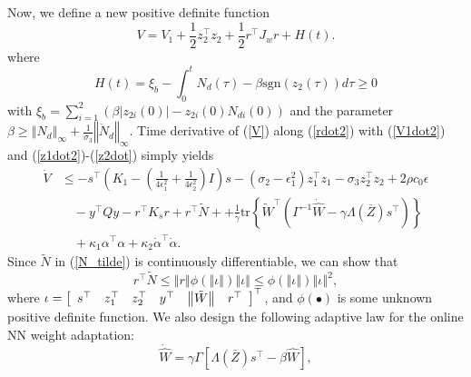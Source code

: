 \documentclass{article}
\newcommand{\sgn}{\text{sgn}}
\newcommand{\tr}{\text{tr}}
\begin{document}
	Now, we define a new positive definite function
	\begin{equation}
	V = V_{1} + \frac{1}{2}z_{2}^{\top}z_{2} + \frac{1}{2}r^{\top}J_{w}r + H(t). \label{V}
	\end{equation}
	where 
	\begin{equation}
	H(t) = \xi_{b}-\int_{0}^{t}N_{d}(\tau)-\beta\sgn\left(z_{2}(\tau)\right)d\tau \geq 0
	\end{equation}
	with $\xi_{b}=\sum_{i=1}^{2}\left(\beta\left\vert z_{2i}(0)\right\vert - z_{2i}(0)N_{di}(0) \right)$ and the parameter $\beta \geq \left\Vert N_{d}\right\Vert_{\infty} + \frac{1}{\sigma_{3}}\left\Vert\dot{N}_{d}\right\Vert_{\infty}$. Time derivative of (\ref{V}) along (\ref{rdot2}) with (\ref{V1dot2}) and (\ref{z1dot2})-(\ref{z2dot}) simply yields
	\begin{align}
	\dot{V} &\leq -s^{\top}\left(K_{1}-\left(\frac{1}{4\epsilon_{1}^{2}}+\frac{1}{4\epsilon_{2}^{2}}\right)I\right)s - \left(\sigma_{2}-\epsilon_{1}^{2}\right)z_{1}^{\top}z_{1} - \sigma_{3}z_{2}^{\top}z_{2} + 2\rho c_{0}\epsilon \nonumber \\ 
	& \quad - y^{\top}Qy - r^{\top}K_{s}r + r^{\top}\tilde{N} + +\frac{1}{\gamma}\tr\left\{\tilde{W}^{\top}\left(\Gamma^{-1}\dot{\hat{W}}-\gamma\Lambda\left(\bar{Z}\right)s^{\top}\right)\right\} \nonumber \\
	& \quad + \kappa_{1}\alpha^{\top}\alpha + \kappa_{2}\dot{\alpha}^{\top}\dot{\alpha}. \label{Vdot}
	\end{align}
	Since $\tilde{N}$ in (\ref{N_tilde}) is continuously differentiable, we can show that
	\begin{equation}
	r^{\top}\tilde{N} \leq \left\Vert r\right\Vert\phi\left(\left\Vert \iota\right\Vert\right)\left\Vert \iota\right\Vert \leq\phi\left(\left\Vert \iota\right\Vert\right)\left\Vert \iota\right\Vert^{2}, \label{rN_tilde}
	\end{equation}
	where $\iota = \left[
	\begin{array}[c]{cccccc}
	s^{\top} & z_{1}^{\top} & z_{2}^{\top} & y^{\top} & \left\Vert \tilde{W}\right\Vert & r^{\top} \\
	\end{array}
	\right]^{\top}$, and $\phi(\bullet)$ is some unknown positive definite function. We also design the following adaptive law for the online NN weight adaptation:
	\begin{equation}
	\dot{\hat{W}} = \gamma\Gamma\left[\Lambda\left(\bar{Z}\right)s^{\top} - \beta\hat{W}\right], \label{adaptive_law}
	\end{equation} 
\end{document}
